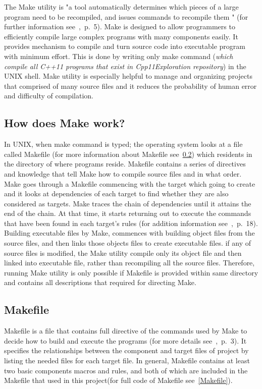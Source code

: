 \documentclass[11pt]{report}
\begin{document}
The Make utility is "a tool automatically determines which pieces of a large program need to be recompiled, and issues commands to recompile them " (for further information see~\cite{Stallman:2000:GnuMake},~p.~5). Make is designed to allow programmers to efficiently compile large complex programs with many components easily. It provides mechanism to compile and turn source code into executable program with minimum effort. This is done by writing only make command (\emph{which compile all C++11 programs that exist in Cpp11Exploration repository}) in the UNIX shell. Make utility is especially helpful to manage and organizing projects that comprised of many source files and it reduces the probability of human error and difficulty of compilation.

\subsection{How does Make work?}
\label{subsec: how make work}
In UNIX, when make command is typed; the operating system looks at a file called Makefile (for more information about Makefile see~\ref{subsec: makefile}) which residents in the directory of where programs reside. Makefile contains a series of directives and knowledge that tell Make how to compile source files and in what order. Make goes through a Makefile commencing with the target which going to create and it looks at dependencies of each target to find whether they are also considered as targets. Make traces the chain of dependencies until it attains the end of the chain. At that time, it starts returning out to execute the commands that have been found in each target's rules (for addition information see~\cite{Stallman:2000:GnuMake},~p.~18). Building executable files by Make, commences with building object files from the source files, and then links those objects files to create executable files. if any of source files is modified, the Make utility compile only its object file and then linked into executable file, rather than recompiling all the source files. Therefore, running Make utility is only possible if Makefile is provided within same directory and contains all descriptions that required for directing Make.

\subsection{Makefile}
\label{subsec: makefile}
Makefile is a file that contains full directive of the commands used by Make to decide how to build and execute the programs (for more details see~\cite{Mecklenburg:2004:MakeGun},~p.~3). It specifies the relationships between the component and target files of project by listing the needed files for each target file. In general, Makefile contains at least two basic components macros and rules, and both of which are included in the Makefile that used in this project(for full code of Makefile see~\ref{Makefile}).
\end{document}
